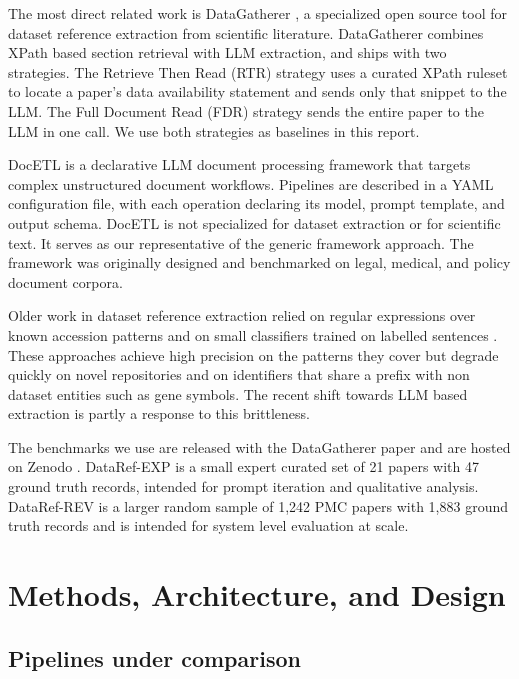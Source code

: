 \documentclass[sigconf,nonacm]{acmart}
\begin{document}
The most direct related work is DataGatherer \cite{marini2025datagatherer}, a specialized open source tool for dataset reference extraction from scientific literature. DataGatherer combines XPath based section retrieval with LLM extraction, and ships with two strategies. The Retrieve Then Read (RTR) strategy uses a curated XPath ruleset to locate a paper's data availability statement and sends only that snippet to the LLM. The Full Document Read (FDR) strategy sends the entire paper to the LLM in one call. We use both strategies as baselines in this report.

DocETL \cite{shankar2024docetl} is a declarative LLM document processing framework that targets complex unstructured document workflows. Pipelines are described in a YAML configuration file, with each operation declaring its model, prompt template, and output schema. DocETL is not specialized for dataset extraction or for scientific text. It serves as our representative of the generic framework approach. The framework was originally designed and benchmarked on legal, medical, and policy document corpora.

Older work in dataset reference extraction relied on regular expressions over known accession patterns and on small classifiers trained on labelled sentences \cite{singh2018datasetnaming, prasad2019dataset}. These approaches achieve high precision on the patterns they cover but degrade quickly on novel repositories and on identifiers that share a prefix with non dataset entities such as gene symbols. The recent shift towards LLM based extraction is partly a response to this brittleness.

The benchmarks we use are released with the DataGatherer paper \cite{marini2025datagatherer} and are hosted on Zenodo \cite{dataref2024zenodo}. DataRef-EXP is a small expert curated set of 21 papers with 47 ground truth records, intended for prompt iteration and qualitative analysis. DataRef-REV is a larger random sample of 1{,}242 PMC papers with 1{,}883 ground truth records and is intended for system level evaluation at scale.

\section{Methods, Architecture, and Design}
\label{sec:methods}

\subsection{Pipelines under comparison}
\end{document}
